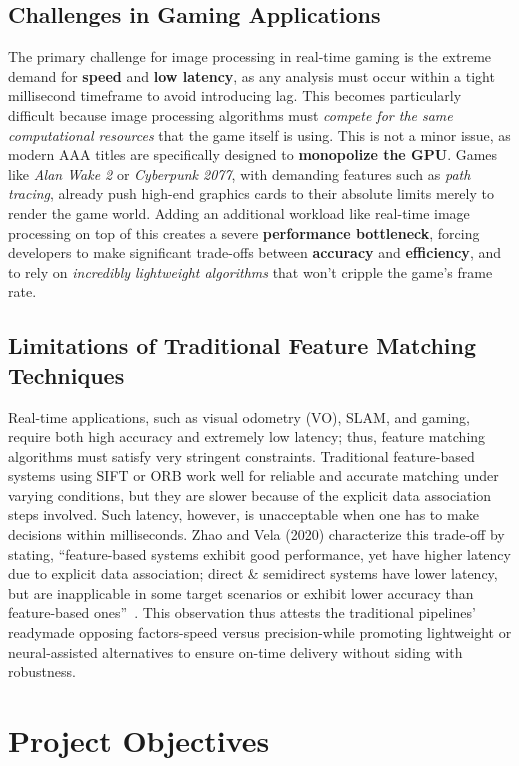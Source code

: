 \subsection{Challenges in Gaming Applications}
The primary challenge for image processing in real-time gaming is the extreme demand for \textbf{speed} and \textbf{low latency}, as any analysis must occur within a tight millisecond timeframe to avoid introducing lag. This becomes particularly difficult because image processing algorithms must \textit{compete for the same computational resources} that the game itself is using. This is not a minor issue, as modern AAA titles are specifically designed to \textbf{monopolize the GPU}. Games like \textit{Alan Wake 2} or \textit{Cyberpunk 2077}, with demanding features such as \textit{path tracing}, already push high-end graphics cards to their absolute limits merely to render the game world. Adding an additional workload like real-time image processing on top of this creates a severe \textbf{performance bottleneck}, forcing developers to make significant trade-offs between \textbf{accuracy} and \textbf{efficiency}, and to rely on \textit{incredibly lightweight algorithms} that won't cripple the game's frame rate.

\subsection{Limitations of Traditional Feature Matching Techniques}
Real-time applications, such as visual odometry (VO), SLAM, and gaming, require both high accuracy and extremely low latency; thus, feature matching algorithms must satisfy very stringent constraints. Traditional feature-based systems using SIFT or ORB work well for reliable and accurate matching under varying conditions, but they are slower because of the explicit data association steps involved. Such latency, however, is unacceptable when one has to make decisions within milliseconds. Zhao and Vela (2020) characterize this trade-off by stating, ``feature-based systems exhibit good performance, yet have higher latency due to explicit data association; direct \& semidirect systems have lower latency, but are inapplicable in some target scenarios or exhibit lower accuracy than feature-based ones''~\cite{zhao2020good}. This observation thus attests the traditional pipelines' readymade opposing factors-speed versus precision-while promoting lightweight or neural-assisted alternatives to ensure on-time delivery without siding with robustness.

\section{Project Objectives}
